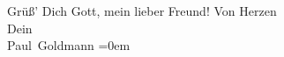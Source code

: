 \begin{ledgroupsized}[t]{13cm}
           \pstart
           Grüß’ Dich Gott, mein lieber Freund!\pend
           \pstart
           Von Herzen {\\[\baselineskip]}Dein {\\[\baselineskip]}\spacefill\mbox{Paul Goldmann}\pend
           \leftskip=0em{}
         
         \endnumbering{}\end{ledgroupsized}  \newcommand{\dateiname}{L02768}\newcommand{\titel}{Paul Goldmann an Arthur Schnitzler, 22. 3. [1896]}\newcommand{\editorInnen}{Martin Anton Müller und Laura Untner}
      